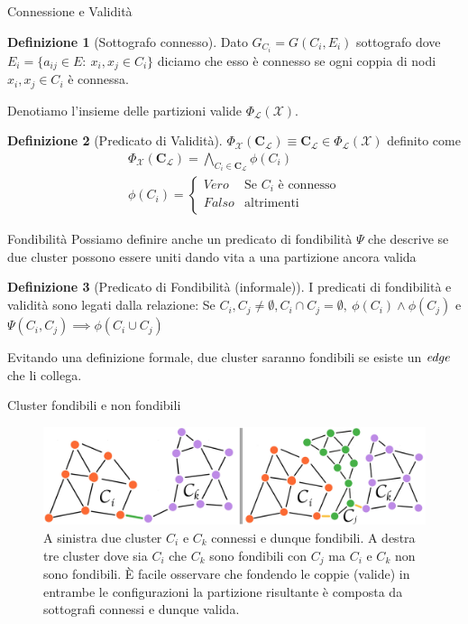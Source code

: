 \documentclass[usenames,dvipsnames,9pt]{beamer}
\theoremstyle{definition}
\newtheorem{deff}{Definizione}
\begin{document}
\begin{frame}{Connessione e Validità}
\begin{deff}[Sottografo connesso]
Dato $G_{C_i}=G(C_i, E_i)$ sottografo dove $E_i=\{a_{ij}\in E: \ x_i, x_j\in C_i\}$ diciamo che esso è connesso se ogni coppia di nodi $x_i, x_j\in C_i$ è connessa.
\end{deff}
Denotiamo l'insieme delle partizioni valide $\Phi_\mathcal{L}(\mathcal{X})$.
\begin{deff}[Predicato di Validità]
$\mathit{\Phi}_\mathcal{X}(\textbf{C}_\mathcal{L}) \equiv \textbf{C}_\mathcal{L}\in \Phi_\mathcal{L}(\mathcal{X})$ definito come
\begin{equation*}
\begin{gathered}
\mathit{\Phi}_\mathcal{X}(\textbf{C}_\mathcal{L}) = \bigwedge_{C_i\in\textbf{C}_\mathcal{L}}\phi(C_i) \\
\phi(C_i) = 
  \begin{cases}
                                   Vero & \text{Se $C_i$ è connesso} \\
                                   Falso & \text{altrimenti} \\
  \end{cases}
\end{gathered}
\end{equation*}
\end{deff}
\end{frame}

\begin{frame}{Fondibilità}
Possiamo definire anche un predicato di fondibilità $\Psi$ che descrive se due cluster possono essere uniti dando vita a una partizione ancora valida
\begin{deff}[Predicato di Fondibilità (informale)]
I predicati di fondibilità e validità sono legati dalla relazione:
Se $C_i,C_j\neq \emptyset, C_i\cap C_j =\emptyset, \ \phi(C_i)\wedge\phi(C_j)$ e $\Psi(C_i, C_j) \implies \phi(C_i\cup C_j)$
\end{deff}
Evitando una definizione formale, due cluster saranno fondibili se esiste un $\it{edge}$ che li collega.
\end{frame}

\begin{frame}{Cluster fondibili e non fondibili}
\begin{figure}[t]
\centering
\includegraphics[width=1\textwidth]{graphics/connectedclusters.png}
\caption{A sinistra due cluster $C_i$ e $C_k$ connessi e dunque fondibili. A destra tre cluster dove sia $C_i$ che $C_k$ sono fondibili con $C_j$ ma $C_i$ e $C_k$ non sono fondibili. È facile osservare che fondendo le coppie (valide) in entrambe le configurazioni la partizione risultante è composta da sottografi connessi e dunque valida.}
\end{figure}
\end{frame}
\end{document}
